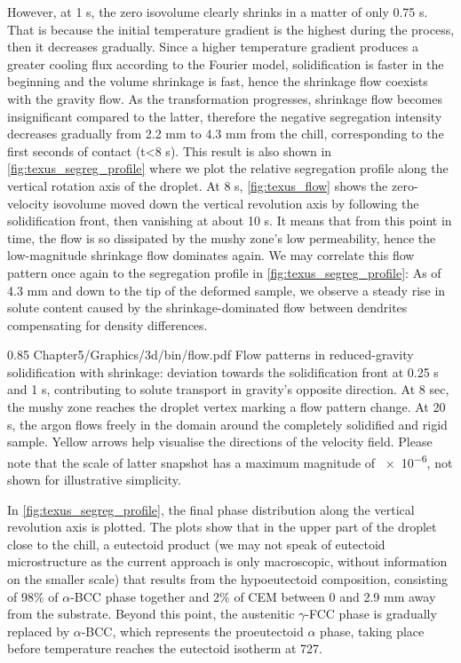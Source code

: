 However, at 1 s, the zero isovolume clearly shrinks in a matter of only 0.75 s. That is
because the initial temperature gradient is the highest during the process, then it decreases gradually. 
Since a higher temperature gradient produces a greater cooling flux according to the Fourier model, solidification is faster
in the beginning and the volume shrinkage is fast, hence the shrinkage flow coexists with the gravity flow. As the transformation
progresses, shrinkage flow becomes insignificant compared to the latter, therefore the negative segregation intensity decreases gradually from 2.2 mm
to 4.3 mm from the chill, corresponding to the first seconds of contact (t<8 s).
This result is also shown in \cref{fig:texus_segreg_profile} where we plot the relative segregation profile along the vertical rotation axis of the droplet.
At 8 s, \cref{fig:texus_flow} shows the zero-velocity isovolume moved down the vertical revolution axis by following
the solidification front, then vanishing at about 10 s. It means that from this point in time, the flow is so dissipated by the mushy zone's low permeability,
hence the low-magnitude shrinkage flow dominates again.
We may correlate this flow pattern once again to the segregation profile in \cref{fig:texus_segreg_profile}:
As of 4.3 mm and down to the tip of the deformed sample, we observe a steady rise in solute content caused 
by the shrinkage-dominated flow between dendrites compensating for density differences. 
\begin{figureth}
{0.85}
{Chapter5/Graphics/3d/bin/flow.pdf}
{Flow patterns in reduced-gravity solidification with shrinkage: 
deviation towards the solidification front at 0.25 s and 1 s, contributing to solute transport in gravity's opposite direction.
At 8 sec, the mushy zone reaches the droplet vertex marking a flow pattern change. 
At 20 s, the argon flows freely in the domain around the completely solidified and rigid sample.
Yellow arrows help visualise the directions of the velocity field. 
Please note that the scale of latter snapshot has a maximum magnitude of \SI{e-6}{\uvelocity}, not shown
for illustrative simplicity.}
\label{fig:texus_flow}
\end{figureth}
In \cref{fig:texus_segreg_profile}, the final phase distribution along the vertical revolution axis is plotted.
The plots show that in the upper part of the droplet close to the chill, a eutectoid product (we may not speak of eutectoid microstructure as the current approach is only macroscopic, without
information on the smaller scale) that results from the hypoeutectoid composition, consisting of 98\% of $\alpha$-BCC phase together and 2\% of CEM between 0 and 2.9 mm away from the substrate.
Beyond this point, the austenitic $\gamma$-FCC phase is gradually replaced by $\alpha$-BCC, which represents the proeutectoid $\alpha$ phase, taking place before temperature
reaches the eutectoid isotherm at \SI{727}{\udegC}.

